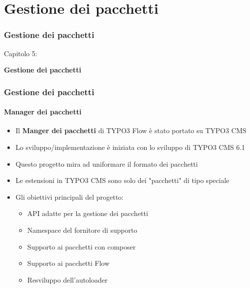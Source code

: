 %

\section{Gestione dei pacchetti}
\begin{frame}[fragile]
	\frametitle{Gestione dei pacchetti}

	\begin{center}\huge{Capitolo 5:}\end{center}
	\begin{center}\huge{\color{typo3darkgrey}\textbf{Gestione dei pacchetti}}\end{center}

\end{frame}


\begin{frame}[fragile]
	\frametitle{Gestione dei pacchetti}
	\framesubtitle{Manager dei pacchetti}

	\begin{itemize}
		\item Il \textbf{Manger dei pacchetti} di TYPO3 Flow è stato portato su TYPO3 CMS
		\item Lo sviluppo/implementazione è iniziata con lo sviluppo di TYPO3 CMS 6.1
		\item Questo progetto mira ad uniformare il formato dei pacchetti
		\item Le estensioni in TYPO3 CMS sono solo dei "pacchetti" di tipo speciale
		\item Gli obiettivi principali del progetto:

			\begin{itemize}
				\item API adatte per la gestione dei pacchetti
				\item Namespace del fornitore di supporto
				\item Supporto ai pacchetti con composer
				\item Supporto ai pacchetti Flow
				\item Resviluppo dell'autoloader
			\end{itemize}

	\end{itemize}

\end{frame}

